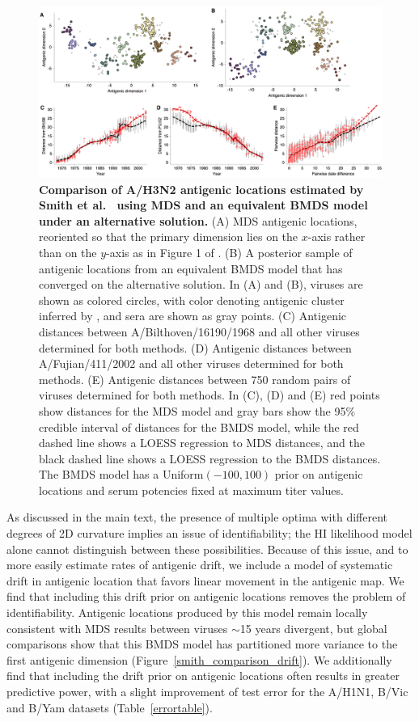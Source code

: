 \documentclass[11pt,oneside,letterpaper]{article}
\begin{document}
\begin{figure}[h]
	\centering		
	\includegraphics[width=1.0\textwidth]{figures/smith_comparison_rotation}
	\caption{\textbf{Comparison of A/H3N2 antigenic locations estimated by Smith et al.\ \cite{Smith04} using MDS and an equivalent BMDS model under an alternative solution.} 
	(A) MDS antigenic locations, reoriented so that the primary dimension lies on the $x$-axis rather than on the $y$-axis as in Figure 1 of \cite{Smith04}.
	(B) A posterior sample of antigenic locations from an equivalent BMDS model that has converged on the alternative solution.
	In (A) and (B), viruses are shown as colored circles, with color denoting antigenic cluster inferred by \cite{Smith04}, and sera are shown as gray points.
	(C) Antigenic distances between A/Bilthoven/16190/1968 and all other viruses determined for both methods.
	(D) Antigenic distances between A/Fujian/411/2002 and all other viruses determined for both methods.
	(E) Antigenic distances between 750 random pairs of viruses determined for both methods.	
	In (C), (D) and (E) red points show distances for the MDS model and gray bars show the 95\% credible interval of distances for the BMDS model, while the red dashed line shows a LOESS regression to MDS distances, and the black dashed line shows a LOESS regression to the BMDS distances.
	The BMDS model has a Uniform$(-100,100)$ prior on antigenic locations and serum potencies fixed at maximum titer values. 	
	} 
	\label{smith_comparison_rotation} 
\end{figure}

As discussed in the main text, the presence of multiple optima with different degrees of 2D curvature implies an issue of identifiability; the HI likelihood model alone cannot distinguish between these possibilities.
Because of this issue, and to more easily estimate rates of antigenic drift, we include a model of systematic drift in antigenic location that favors linear movement in the antigenic map.
We find that including this drift prior on antigenic locations removes the problem of identifiability.
Antigenic locations produced by this model remain locally consistent with MDS results between viruses $\sim$15 years divergent, but global comparisons show that this BMDS model has partitioned more variance to the first antigenic dimension (Figure~\ref{smith_comparison_drift}).
We additionally find that including the drift prior on antigenic locations often results in greater predictive power, with a slight improvement of test error for the A/H1N1, B/Vic and B/Yam datasets (Table~\ref{errortable}).
\end{document}

